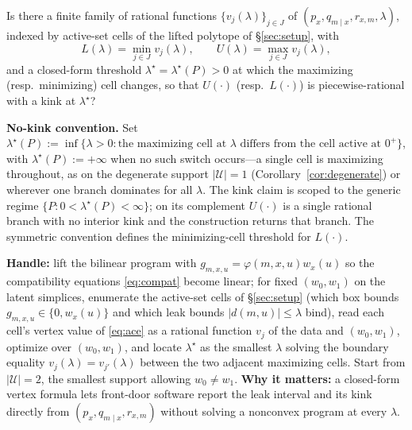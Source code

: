 \documentclass[11pt]{article}
\theoremstyle{definition}
\theoremstyle{plain}
\theoremstyle{remark}
\begin{document}
\begin{openendedquestion}\label{oeq:vertex}
Is there a finite family of rational functions $\{v_j(\lambda)\}_{j\in J}$ of $(p_x,q_{m\mid x},r_{x,m},\lambda)$,
indexed by active-set cells of the lifted polytope of \S\ref{sec:setup}, with
\[
  L(\lambda)=\min_{j\in J}v_j(\lambda),\qquad U(\lambda)=\max_{j\in J}v_j(\lambda),
\]
and a closed-form threshold $\lambda^\star=\lambda^\star(P)>0$ at which the maximizing (resp.\ minimizing)
cell changes, so that $U(\cdot)$ (resp.\ $L(\cdot)$) is piecewise-rational with a kink at $\lambda^\star$?

\smallskip\noindent\textbf{No-kink convention.} Set
$\lambda^\star(P):=\inf\{\lambda>0:\text{the maximizing cell at }\lambda\text{ differs from the cell active at }0^+\}$,
with $\lambda^\star(P):=+\infty$ when no such switch occurs---a single cell is maximizing throughout, as on the
degenerate support $|\mathcal U|=1$ (Corollary~\ref{cor:degenerate}) or wherever one branch dominates for all
$\lambda$. The kink claim is scoped to the generic regime $\{P:0<\lambda^\star(P)<\infty\}$; on its complement
$U(\cdot)$ is a single rational branch with no interior kink and the construction returns that branch. The
symmetric convention defines the minimizing-cell threshold for $L(\cdot)$.

\smallskip\noindent\textbf{Handle:} lift the bilinear program with $g_{m,x,u}=\varphi(m,x,u)w_x(u)$ so the
compatibility equations \eqref{eq:compat} become linear; for fixed $(w_0,w_1)$ on the latent simplices,
enumerate the active-set cells of \S\ref{sec:setup} (which box bounds $g_{m,x,u}\in\{0,w_x(u)\}$ and which
leak bounds $|d(m,u)|\le\lambda$ bind), read each cell's vertex value of \eqref{eq:ace} as a rational
function $v_j$ of the data and $(w_0,w_1)$, optimize over $(w_0,w_1)$, and locate $\lambda^\star$ as the
smallest $\lambda$ solving the boundary equality $v_{j}(\lambda)=v_{j'}(\lambda)$ between the two adjacent
maximizing cells. Start from $|\mathcal U|=2$, the smallest support allowing $w_0\neq w_1$.
\textbf{Why it matters:} a closed-form vertex formula lets front-door software report the leak interval and
its kink directly from $(p_x,q_{m\mid x},r_{x,m})$ without solving a nonconvex program at every $\lambda$.
\end{openendedquestion}
\end{document}
